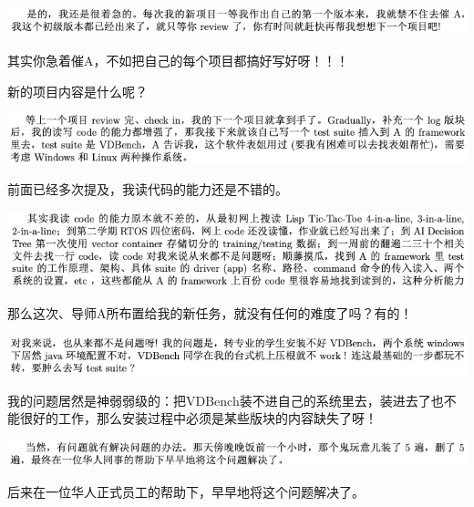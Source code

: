 \documentclass[9pt, b5paper]{article}
\begin{document}
\begin{center}
\includegraphics[width=.9\linewidth]{./pic/backups_plans_20210513_101421.png}
\end{center}

其实你急着催A，不如把自己的每个项目都搞好写好呀！！！

新的项目内容是什么呢？

\begin{center}
\includegraphics[width=.9\linewidth]{./pic/backups_plans_20210513_101437.png}
\end{center}

前面已经多次提及，我读代码的能力还是不错的。 

\begin{center}
\includegraphics[width=.9\linewidth]{./pic/backups_plans_20210513_101515.png}
\end{center}

那么这次、导师A所布置给我的新任务，就没有任何的难度了吗？有的！

\begin{center}
\includegraphics[width=.9\linewidth]{./pic/backups_plans_20210513_101603.png}
\end{center}

我的问题居然是神弱弱级的：把VDBench装不进自己的系统里去，装进去了也不能很好的工作，那么安装过程中必须是某些版块的内容缺失了呀！

\begin{center}
\includegraphics[width=.9\linewidth]{./pic/backups_plans_20210513_103734.png}
\end{center}

后来在一位华人正式员工的帮助下，早早地将这个问题解决了。 
\end{document}
